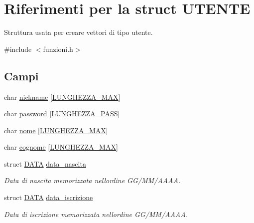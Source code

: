 \hypertarget{struct_u_t_e_n_t_e}{}\section{Riferimenti per la struct U\+T\+E\+N\+TE}
\label{struct_u_t_e_n_t_e}


Struttura usata per creare vettori di tipo utente.  




{\ttfamily \#include $<$funzioni.\+h$>$}

\subsection*{Campi}
\begin{DoxyCompactItemize}
\item 
char \mbox{\hyperlink{struct_u_t_e_n_t_e_a0ae0027764658fd60ce899a829b7b2fe}{nickname}} \mbox{[}\mbox{\hyperlink{funzioni_8h_a2cdd71b92d6e869f8b094e32a6da6a62}{L\+U\+N\+G\+H\+E\+Z\+Z\+A\+\_\+\+M\+AX}}\mbox{]}
\item 
char \mbox{\hyperlink{struct_u_t_e_n_t_e_a04d8337f5e0fe9cd44d36cbe7dac7415}{password}} \mbox{[}\mbox{\hyperlink{funzioni_8h_a21981b6e8c0f57093d564c3df476f9ee}{L\+U\+N\+G\+H\+E\+Z\+Z\+A\+\_\+\+P\+A\+SS}}\mbox{]}
\item 
char \mbox{\hyperlink{struct_u_t_e_n_t_e_acd2869ae6d739de9978a588124906ae8}{nome}} \mbox{[}\mbox{\hyperlink{funzioni_8h_a2cdd71b92d6e869f8b094e32a6da6a62}{L\+U\+N\+G\+H\+E\+Z\+Z\+A\+\_\+\+M\+AX}}\mbox{]}
\item 
char \mbox{\hyperlink{struct_u_t_e_n_t_e_ad7797bd318a25af80b02a7751ebd4b9a}{cognome}} \mbox{[}\mbox{\hyperlink{funzioni_8h_a2cdd71b92d6e869f8b094e32a6da6a62}{L\+U\+N\+G\+H\+E\+Z\+Z\+A\+\_\+\+M\+AX}}\mbox{]}
\item 
struct \mbox{\hyperlink{struct_d_a_t_a}{D\+A\+TA}} \mbox{\hyperlink{struct_u_t_e_n_t_e_aae6578862368788ad3bbc4af47a36ee0}{data\+\_\+nascita}}
\begin{DoxyCompactList}\small\item\em Data di nascita memorizzata nell\textquotesingle{}ordine G\+G/\+M\+M/\+A\+A\+AA. \end{DoxyCompactList}\item 
struct \mbox{\hyperlink{struct_d_a_t_a}{D\+A\+TA}} \mbox{\hyperlink{struct_u_t_e_n_t_e_adad490891a61a9c3d48062baa067c1e9}{data\+\_\+iscrizione}}
\begin{DoxyCompactList}\small\item\em Data di iscrizione memorizzata nell\textquotesingle{}ordine G\+G/\+M\+M/\+A\+A\+AA. \end{DoxyCompactList}\item 

\end{DoxyCompactItemize}
